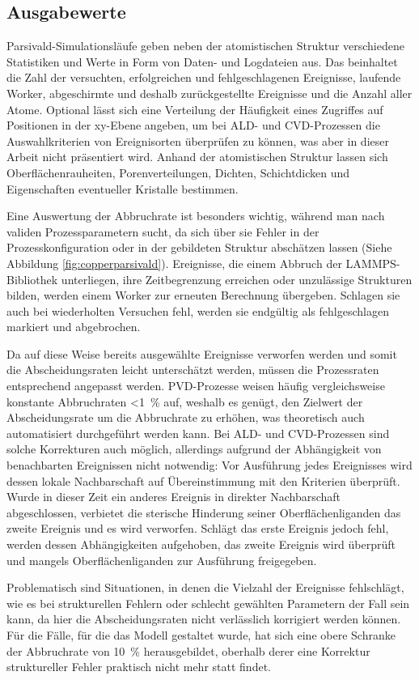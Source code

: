 
\subsection{Ausgabewerte}

Parsivald-Simulationsläufe geben neben der atomistischen Struktur verschiedene Statistiken und Werte in Form von Daten- und Logdateien aus.
Das beinhaltet die Zahl der versuchten, erfolgreichen und fehlgeschlagenen Ereignisse, laufende Worker, abgeschirmte und deshalb zurückgestellte Ereignisse und die Anzahl aller Atome.
Optional lässt sich eine Verteilung der Häufigkeit eines Zugriffes auf Positionen in der xy-Ebene angeben, um bei ALD- und CVD-Prozessen die Auswahlkriterien von Ereignisorten überprüfen zu können, was aber in dieser Arbeit nicht präsentiert wird.
Anhand der atomistischen Struktur lassen sich Oberflächenrauheiten, Porenverteilungen, Dichten, Schichtdicken und Eigenschaften eventueller Kristalle bestimmen.

Eine Auswertung der Abbruchrate ist besonders wichtig, während man nach validen Prozessparametern sucht, da sich über sie Fehler in der Prozesskonfiguration oder in der gebildeten Struktur abschätzen lassen (Siehe Abbildung \ref{fig:copperparsivald}).
Ereignisse, die einem Abbruch der LAMMPS-Bibliothek unterliegen, ihre Zeitbegrenzung erreichen oder unzulässige Strukturen bilden, werden einem Worker zur erneuten Berechnung übergeben.
Schlagen sie auch bei wiederholten Versuchen fehl, werden sie endgültig als fehlgeschlagen markiert und abgebrochen.

Da auf diese Weise bereits ausgewählte Ereignisse verworfen werden und somit die Abscheidungsraten leicht unterschätzt werden, müssen die Prozessraten entsprechend angepasst werden.
PVD-Prozesse weisen häufig vergleichsweise konstante Abbruchraten \SI{<1}{\percent} auf, weshalb es genügt, den Zielwert der Abscheidungsrate um die Abbruchrate zu erhöhen, was theoretisch auch automatisiert durchgeführt werden kann.
Bei ALD- und CVD-Prozessen sind solche Korrekturen auch möglich, allerdings aufgrund der Abhängigkeit von benachbarten Ereignissen nicht notwendig:
Vor Ausführung jedes Ereignisses wird dessen lokale Nachbarschaft auf Übereinstimmung mit den Kriterien überprüft.
Wurde in dieser Zeit ein anderes Ereignis in direkter Nachbarschaft abgeschlossen, verbietet die sterische Hinderung seiner Oberflächenliganden das zweite Ereignis und es wird verworfen.
Schlägt das erste Ereignis jedoch fehl, werden dessen Abhängigkeiten aufgehoben, das zweite Ereignis wird überprüft und mangels Oberflächenliganden zur Ausführung freigegeben.

Problematisch sind Situationen, in denen die Vielzahl der Ereignisse fehlschlägt, wie es bei strukturellen Fehlern oder schlecht gewählten Parametern der Fall sein kann, da hier die Abscheidungsraten nicht verlässlich korrigiert werden können.
Für die Fälle, für die das Modell gestaltet wurde, hat sich eine obere Schranke der Abbruchrate von \SI{10}{\percent} herausgebildet, oberhalb derer eine Korrektur struktureller Fehler praktisch nicht mehr statt findet.
